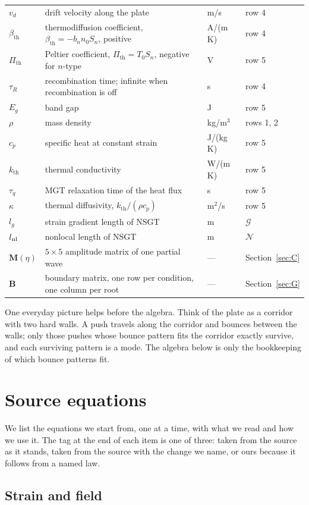 \documentclass[11pt,a4paper]{article}
\newcommand{\Nc}{\mathcal{N}}
\newcommand{\Gc}{\mathcal{G}}
\newcommand{\bth}{\beta_{\mathrm{th}}}
\newcommand{\Pth}{\Pi_{\mathrm{th}}}
\newcommand{\kB}{k_{\mathrm{th}}}
\begin{document}
\begin{center}
\begin{tabular}{p{2.1cm}p{5.6cm}p{1.9cm}p{4.6cm}}
$v_d$ & drift velocity along the plate & m/s & row 4\\
$\bth$ & thermodiffusion coefficient, $\bth=-b_nn_0S_n$, positive & A/(m\,K) & row 4\\
$\Pth$ & Peltier coefficient, $\Pth=T_0S_n$, negative for $n$-type & V & row 5\\
$\tau_R$ & recombination time; infinite when recombination is off & s & row 4\\
$E_g$ & band gap & J & row 5\\
$\rho$ & mass density & kg/m$^3$ & rows 1, 2\\
$c_p$ & specific heat at constant strain & J/(kg\,K) & row 5\\
$\kB$ & thermal conductivity & W/(m\,K) & row 5\\
$\tau_q$ & MGT relaxation time of the heat flux & s & row 5\\
$\kappa$ & thermal diffusivity, $\kB/(\rho c_p)$ & m$^2$/s & row 5\\
$l_g$ & strain gradient length of NSGT & m & $\Gc$\\
$l_{\rm nl}$ & nonlocal length of NSGT & m & $\Nc$\\
$\mathbf M(\eta)$ & $5\times5$ amplitude matrix of one partial wave & --- & Section~\ref{sec:C}\\
$\mathbf B$ & boundary matrix, one row per condition, one column per root & --- & Section~\ref{sec:G}\\
\bottomrule
\end{tabular}
\end{center}

One everyday picture helps before the algebra. Think of the plate as a corridor with two hard walls. A
push travels along the corridor and bounces between the walls; only those pushes whose bounce pattern fits
the corridor exactly survive, and each surviving pattern is a mode. The algebra below is only the
bookkeeping of which bounce patterns fit.

\section{Source equations}\label{sec:src}

We list the equations we start from, one at a time, with what we read and how we use it. The tag at the end
of each item is one of three: taken from the source as it stands, taken from the source with the change we
name, or ours because it follows from a named law.

\subsection{Strain and field}
\end{document}
